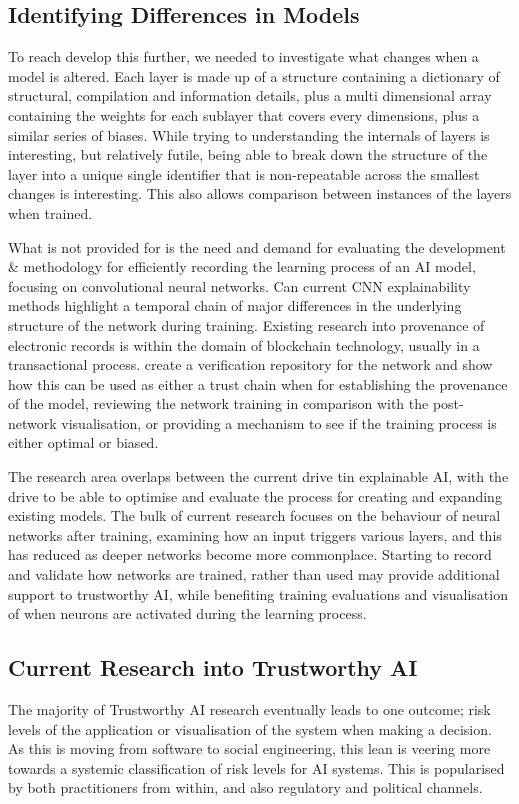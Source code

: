 \subsection{Identifying Differences in Models}
To reach develop this further, we needed to investigate what changes when a model is altered. Each layer is made up of a structure containing a dictionary of structural, compilation and information details, plus a multi dimensional array containing the weights for each sublayer that covers every  dimensions, plus a similar series of biases. While trying to understanding the internals of layers is interesting, but relatively futile, being able to break down the structure of the layer into a unique single identifier that is non-repeatable across the smallest changes is interesting. This also allows comparison between instances of the layers when trained.

What is not provided for is the need and demand for evaluating the development \& methodology for efficiently recording the learning process of an AI model, focusing on convolutional neural networks. Can current CNN explainability methods highlight a temporal chain of major differences in the underlying structure of the network during training. Existing research into provenance of electronic records is within the domain of blockchain technology, usually in a transactional process\cite{kimOntologydrivenBlockchainDesign2018}. create a verification repository for the network and show how this can be used as either a trust chain when for establishing the provenance of the model, reviewing the network training in comparison with the post-network visualisation, or providing a mechanism to see if the training process is either optimal or biased.

The research area overlaps between the current drive tin explainable AI, with the drive to be able to optimise and evaluate the process for creating and expanding existing models. The bulk of current research focuses on the behaviour of neural networks after training, examining how an input triggers various layers, and this has reduced as deeper networks become more commonplace. Starting to record and validate how networks are trained, rather than used may provide additional support to trustworthy AI, while benefiting training evaluations and visualisation of when neurons are activated during the learning process.


\subsection{Current Research into Trustworthy AI}
The majority of Trustworthy AI research eventually leads to one outcome; risk levels of the application or visualisation of the system when making a decision. As this is moving from software to social engineering, this lean is veering more towards a systemic classification of risk levels for AI systems. This is popularised by both practitioners from within, and also regulatory and political channels.


